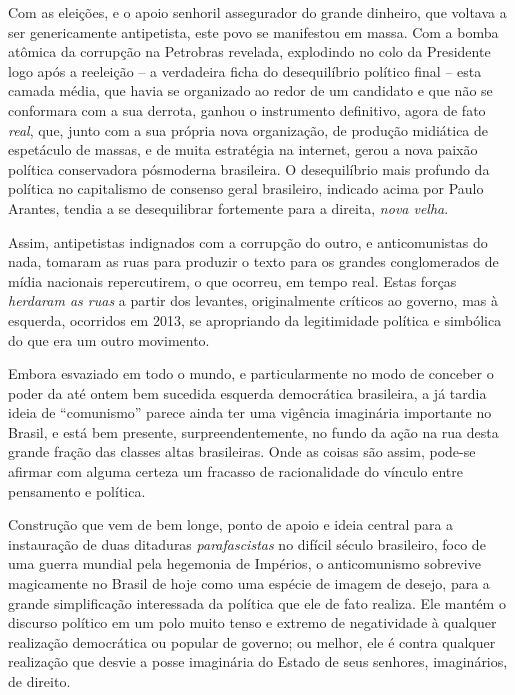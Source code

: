 Com as eleições, e o apoio senhoril assegurador do grande dinheiro, que
voltava a ser genericamente antipetista, este povo se manifestou em
massa. Com a bomba atômica da corrupção na Petrobras revelada,
explodindo no colo da Presidente logo após a reeleição -- a verdadeira
ficha do desequilíbrio político final -- esta camada média, que havia se
organizado ao redor de um candidato e que não se conformara com a sua
derrota, ganhou o instrumento definitivo, agora de fato \emph{real},
que, junto com a sua própria nova organização, de produção midiática de
espetáculo de massas, e de muita estratégia na internet, gerou a nova
paixão política conservadora pósmoderna brasileira. O desequilíbrio mais
profundo da política no capitalismo de consenso geral brasileiro,
indicado acima por Paulo Arantes, tendia a se desequilibrar fortemente
para a direita, \emph{nova velha}.

Assim, antipetistas indignados com a corrupção do outro, e
anticomunistas do nada, tomaram as ruas para produzir o texto para os
grandes conglomerados de mídia nacionais repercutirem, o que ocorreu, em
tempo real. Estas forças \emph{herdaram as ruas} a partir dos levantes,
originalmente críticos ao governo, mas à esquerda, ocorridos em 2013, se
apropriando da legitimidade política e simbólica do que era um outro
movimento.

Embora esvaziado em todo o mundo, e particularmente no modo de conceber
o poder da até ontem bem sucedida esquerda democrática brasileira, a já
tardia ideia de ``comunismo'' parece ainda ter uma vigência imaginária
importante no Brasil, e está bem presente, surpreendentemente, no fundo
da ação na rua desta grande fração das classes altas brasileiras. Onde
as coisas são assim, pode-se afirmar com alguma certeza um fracasso de
racionalidade do vínculo entre pensamento e política.

Construção que vem de bem longe, ponto de apoio e ideia central para a
instauração de duas ditaduras \emph{parafascistas} no difícil século 
brasileiro, foco de uma guerra mundial pela hegemonia de Impérios, o
anticomunismo sobrevive magicamente no Brasil de hoje como uma espécie
de imagem de desejo, para a grande simplificação interessada da política
que ele de fato realiza. Ele mantém o discurso político em um polo muito
tenso e extremo de negatividade à qualquer realização democrática ou
popular de governo; ou melhor, ele é contra qualquer realização que
desvie a posse imaginária do Estado de seus senhores, imaginários, de
direito.

